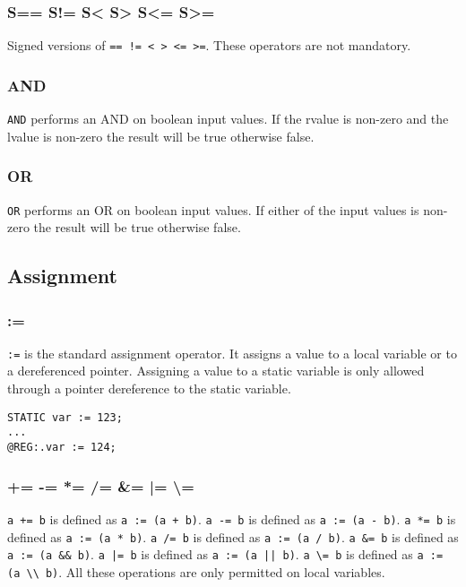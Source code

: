 \subsubsection{S== S!= S< S> S<= S>=}

Signed versions of \verb|== != < > <= >=|.  These operators are not mandatory. 

\subsubsection{AND}

\verb|AND| performs an AND on boolean input values. If the rvalue is non-zero and the lvalue is non-zero the result will be true otherwise false. 

\subsubsection{OR}

\verb|OR| performs an OR on boolean input values. If either of the input values is non-zero the result will be true otherwise false. 

\subsection{Assignment}

\subsubsection{:=}

\verb|:=| is the standard assignment operator. It assigns a value to a local variable or to a dereferenced pointer. Assigning a value to a static variable
is only allowed through a pointer dereference to the static variable.

\begin{verbatim}
STATIC var := 123;
...
@REG:.var := 124;
\end{verbatim}

\subsubsection{+= -= *= /= \&= |= \textbackslash=}

\verb|a += b| is defined as \verb|a := (a + b)|.  \verb|a -= b| is defined as \verb|a := (a - b)|.  \verb|a *= b| is defined as \verb|a := (a * b)|. 
\verb|a /= b| is defined as \verb|a := (a / b)|.  \verb|a &= b| is defined as \verb|a := (a && b)|. \verb?a |= b? is defined as \verb?a := (a || b)?.
\verb|a \= b| is defined as \verb|a := (a \\ b)|. All these operations are only permitted on local variables. 

